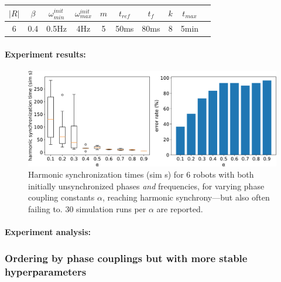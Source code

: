 			\begin{center}
			\begin{tabular}{ |c|c|c|c|c|c|c|c|c|c| } 
			\hline
			$|R|$ & $\beta$ & $\omega_{min}^{init}$ & $\omega_{max}^{init}$ & $m$ & $t_{ref}$ & $t_f$ & $k$ & $t_{max}$ \\
			\hline
			6 & 0.4 & 0.5Hz & 4Hz & 5 & 50ms & 80ms & 8 & 5min \\
			\hline
			\end{tabular}
			\label{tab:baseline_reproducing_phase_and_freq_sync_for_alpha}
			\end{center}
			
			\paragraph{Experiment results:\nl}
			
			\begin{figure}[ht!]
				\centering
				\includegraphics[width=\linewidth]{Assets/DocSegments/Chapters/ExperimentsAndResults/Figures/PerfScores/baseline_reproducing_phase_and_freq_sync_for_alpha.pdf}
				\caption[Experiment results for first $\phi$ \& $\omega$ synchronization baseline reproduction experiment.]{Harmonic synchronization times (sim s) for 6 robots with both initially unsynchronized phases \textit{and} frequencies, for varying phase coupling constants $\alpha$, reaching harmonic synchrony—but also often failing to. 30 simulation runs per $\alpha$ are reported.}
				\label{fig:baseline_reproducing_phase_and_freq_sync_for_alpha}
			\end{figure}
			
			\paragraph{Experiment analysis:\nl}
		
		
		\subsubsection{Ordering by phase couplings but with more stable hyperparameters}
		
